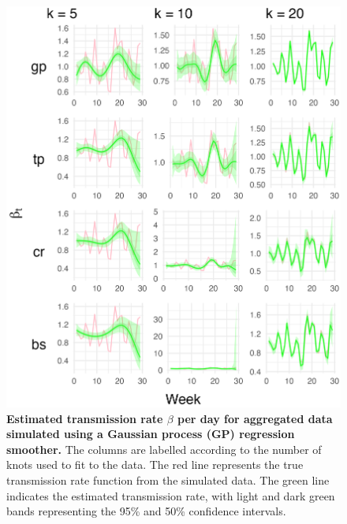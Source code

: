 \documentclass[
11pt, %
oneside, %
english, %
singlespacing, %
]{macthesis} %
\begin{document}
\begin{figure}[H]
\centering
\includegraphics[width=\textwidth]{figure/Simulated/aggregated/simulation_agg_gp_20_k(5,10,20)_bsd1_beta1_plot_beta.png}
\caption[Estimated Simulated and Aggregated Data (GP) Transmission Rate]{\textbf{Estimated transmission rate \(\beta\) per day for aggregated data simulated using a Gaussian process (GP) regression smoother.} The columns are labelled according to the number of knots used to fit to the data. The red line represents the true transmission rate function from the simulated data. The green line indicates the estimated transmission rate, with light and dark green bands representing the 95\% and 50\% confidence intervals.}
\label{fig:transmission_agg_20gp}
\end{figure}
\end{document}
